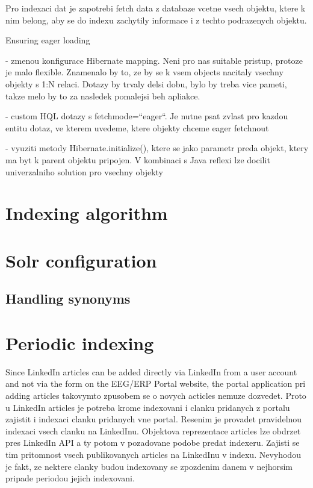 \documentclass[12pt, oneside, a4paper]{book}
\begin{document}
Pro indexaci dat je zapotrebi fetch data z databaze vcetne
vsech objektu, ktere k nim belong, aby se do indexu zachytily
informace i z techto podrazenych objektu.

Ensuring eager loading

- zmenou konfigurace Hibernate mapping. Neni pro nas suitable pristup,
protoze je malo flexible. Znamenalo by to, ze by se k vsem objects
nacitaly vsechny objekty s 1:N relaci. Dotazy by trvaly delsi
dobu, bylo by treba vice pameti, takze melo by to za nasledek
pomalejsi beh apliakce.

- custom HQL dotazy s fetchmode=``eager``. Je nutne psat zvlast
pro kazdou entitu dotaz, ve kterem uvedeme, ktere objekty chceme eager
fetchnout

- vyuziti metody Hibernate.initialize(), ktere se jako parametr preda
objekt, ktery ma byt k parent objektu pripojen. V kombinaci
s Java reflexi lze docilit univerzalniho solution pro vsechny objekty


\section{Indexing algorithm}


\section{Solr configuration}

\subsection{Handling synonyms}


\section{Periodic indexing}

Since LinkedIn articles can be added directly via LinkedIn from a user account and not via the form on the EEG/ERP Portal website, the portal application pri adding
articles takovymto zpusobem se o novych acticles nemuze
dozvedet. Proto u LinkedIn articles je potreba krome
indexovani i clanku pridanych z portalu zajistit i indexaci
clanku pridanych vne portal. Resenim je provadet
pravidelnou indexaci vsech clanku na LinkedInu. Objektova
reprezentace articles lze obdrzet pres LinkedIn API a ty
potom v pozadovane podobe predat indexeru. Zajisti se tim
pritomnost vsech publikovanych articles na LinkedInu v indexu.
Nevyhodou je fakt, ze nektere clanky budou indexovany se zpozdenim
danem v nejhorsim pripade periodou jejich indexovani. 
\end{document}
